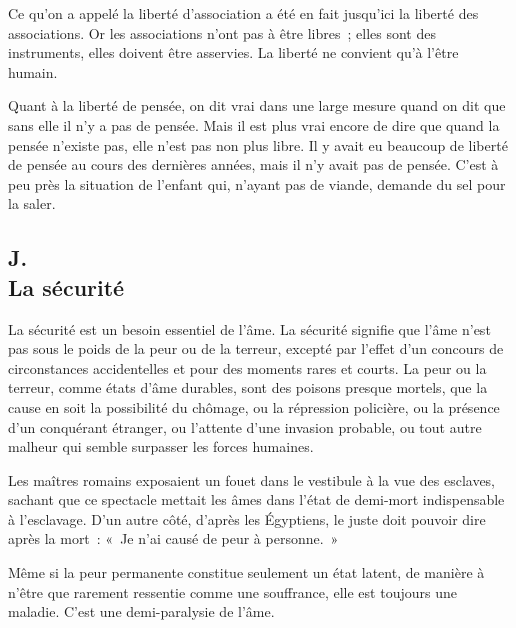 \documentclass[french,twoside]{book} %
\begin{document}
Ce qu'on a appelé la liberté d'association a été en fait jusqu'ici la liberté des associations. Or les associations n'ont pas à être libres ; elles sont des instruments, elles doivent être asservies. La liberté ne convient qu'à l'être humain.\par
Quant à la liberté de pensée, on dit vrai dans une large mesure quand on dit que sans elle il n'y a pas de pensée. Mais il est plus vrai encore de dire que quand la pensée n'existe pas, elle n'est pas non plus libre. Il y avait eu beaucoup de liberté de pensée au cours des dernières années, mais il n'y avait pas de pensée. C'est à peu près la situation de l'enfant qui, n'ayant pas de viande, demande du sel pour la saler.
\subsection[{J. La sécurité}]{J. \\
La sécurité}
\noindent \par
La sécurité est un besoin essentiel de l'âme. La sécurité signifie que l'âme n'est pas sous le poids de la peur ou de la terreur, excepté par l'effet d'un concours de circonstances accidentelles et pour des moments rares et courts. La peur ou la terreur, comme états d'âme durables, sont des poisons presque mortels, que la cause en soit la possibilité du chômage, ou la répression policière, ou la présence d'un conquérant étranger, ou l'attente d'une invasion probable, ou tout autre malheur qui semble surpasser les forces humaines.\par
Les maîtres romains exposaient un fouet dans le vestibule à la vue des esclaves, sachant que ce spectacle mettait les âmes dans l'état de demi-mort indispensable à l'esclavage. D'un autre côté, d'après les Égyptiens, le juste doit pouvoir dire après la mort : « Je n'ai causé de peur à personne. »\par
Même si la peur permanente constitue seulement un état latent, de manière à n'être que rarement ressentie comme une souffrance, elle est toujours une maladie. C'est une demi-paralysie de l'âme.
\end{document}
